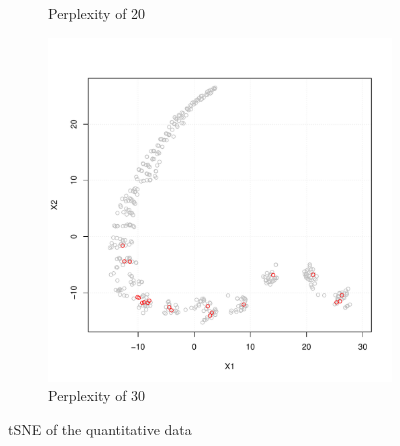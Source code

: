 \documentclass[a4paper, 12pt]{article}
\begin{document}
\begin{figure}[H]
\begin{subfigure}{0.49\textwidth}
            \caption{Perplexity of 20}
            \vspace{1em}
        \end{subfigure}
        \begin{subfigure}{0.49\textwidth}
            \includegraphics[width=\textwidth]{resources/pdf/tSNE_30.pdf}
            \caption{Perplexity of 30}
        \end{subfigure}
        \caption{tSNE of the quantitative data}
        \label{fig:tSNE}
    \end{figure}
    
\end{document}
